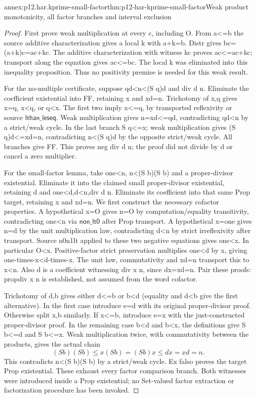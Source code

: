 \begin{annexitem}{annex:p12.har.kprime-small-factor}{thm:p12-har-kprime-small-factor}{Weak product monotonicity, all factor branches and interval exclusion}
\begin{proof}
First prove weak multiplication at every c, including O. From a<=b
the source additive characterization gives a local k with a+k=b.
Distr gives bc=(a+k)c=ac+kc. The additive characterization with
witness kc proves ac<=ac+kc; transport along the equation gives
ac<=bc. The local k was eliminated into this inequality proposition.
Thus no positivity premise is needed for this weak result.

For the no-multiple certificate, suppose qd<n<(S q)d and div d n.
Eliminate the coefficient existential into FF, retaining x and xd=n.
Trichotomy of x,q gives x=q, x<q, or q<x. The first two imply
x<=q, by transported reflexivity or source \(\mathsf{lthan\_leseq}\).
Weak multiplication gives n=xd<=qd, contradicting qd<n by a
strict/weak cycle. In the last branch S q<=x; weak multiplication
gives (S q)d<=xd=n, contradicting n<(S q)d by the opposite
strict/weak cycle. All branches give FF. This proves neg div d n;
the proof did not divide by d or cancel a zero multiplier.

For the small-factor lemma, take one<n, n<(S b)(S b) and a
proper-divisor existential. Eliminate it into the claimed small
proper-divisor existential, retaining d and one<d,d<n,div d n.
Eliminate its coefficient into that same Prop target, retaining x and
xd=n. We first construct the necessary cofactor properties.
A hypothetical x=O gives n=O by computation/equality transitivity,
contradicting one<n via \(\mathsf{non\_lt0}\) after Prop transport. A hypothetical
x=one gives n=d by the unit multiplication law, contradicting d<n
by strict irreflexivity after transport. Source n0n1lt applied to
these two negative equations gives one<x. In particular O<x.
Positive-factor strict preservation multiplies one<d by x, giving
one-times-x<d-times-x. The unit law, commutativity and xd=n
transport this to x<n. Also d is a coefficient witnessing div x n,
since dx=xd=n. Pair these proofs: propdiv x n is established, not
assumed from the word cofactor.

Trichotomy of d,b gives either d<=b or b<d (equality and d<b
give the first alternative). In the first case introduce e=d with
its original proper-divisor proof. Otherwise split x,b similarly.
If x<=b, introduce e=x with the just-constructed proper-divisor
proof. In the remaining case b<d and b<x, the definitions give
S b<=d and S b<=x. Weak multiplication twice, with commutativity
between the products, gives the actual chain
\[
 (S b)(S b)\le x(S b)=(S b)x\le dx=xd=n.
\]
This contradicts n<(S b)(S b) by a strict/weak cycle.
Ex falso proves the target Prop existential. These exhaust every
factor comparison branch. Both witnesses were introduced inside a
Prop existential; no Set-valued factor extraction or factorization
procedure has been invoked.
\end{proof}
\end{annexitem}

